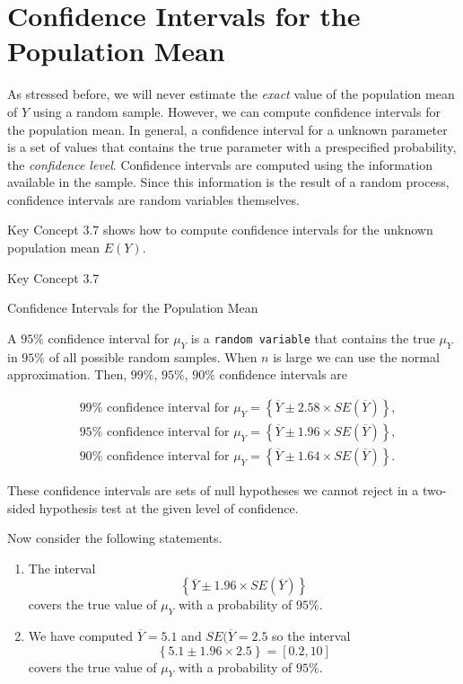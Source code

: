 \documentclass[]{book}
\theoremstyle{definition}
\theoremstyle{definition}
\theoremstyle{definition}
\theoremstyle{remark}
\begin{document}
\section{Confidence Intervals for the Population
Mean}\label{confidence-intervals-for-the-population-mean}

As stressed before, we will never estimate the \emph{exact} value of the
population mean of \(Y\) using a random sample. However, we can compute
confidence intervals for the population mean. In general, a confidence
interval for a unknown parameter is a set of values that contains the
true parameter with a prespecified probability, the \emph{confidence
level}. Confidence intervals are computed using the information
available in the sample. Since this information is the result of a
random process, confidence intervals are random variables themselves.

Key Concept 3.7 shows how to compute confidence intervals for the
unknown population mean \(E(Y)\).

Key Concept 3.7

Confidence Intervals for the Population Mean

A \(95\%\) confidence interval for \(\mu_Y\) is a
\texttt{random variable} that contains the true \(\mu_Y\) in \(95\%\) of
all possible random samples. When \(n\) is large we can use the normal
approximation. Then, \(99\%\), \(95\%\), \(90\%\) confidence intervals
are

\begin{align}
&99\%\text{ confidence interval for } \mu_Y = \left\{ \overline{Y} \pm 2.58 \times SE(\overline{Y}) \right\}, \\
&95\%\text{ confidence interval for } \mu_Y = \left\{ \overline{Y} \pm 1.96 \times SE(\overline{Y}) \right\}, \\
&90\%\text{ confidence interval for } \mu_Y = \left\{ \overline{Y} \pm 1.64 \times SE(\overline{Y}) \right\}.
\end{align}

These confidence intervals are sets of null hypotheses we cannot reject
in a two-sided hypothesis test at the given level of confidence.

Now consider the following statements.

\begin{enumerate}
\def\labelenumi{\arabic{enumi}.}
\item
  The interval
  \[ \left\{ \overline{Y} \pm 1.96 \times SE(\overline{Y}) \right\} \]
  covers the true value of \(\mu_Y\) with a probability of \(95\%\).
\item
  We have computed \(\overline{Y} = 5.1\) and \(SE(\overline{Y}=2.5\) so
  the interval
  \[ \left\{ 5.1  \pm 1.96 \times 2.5 \right\} = \left[0.2,10\right] \]
  covers the true value of \(\mu_Y\) with a probability of \(95\%\).
\end{enumerate}
\end{document}
